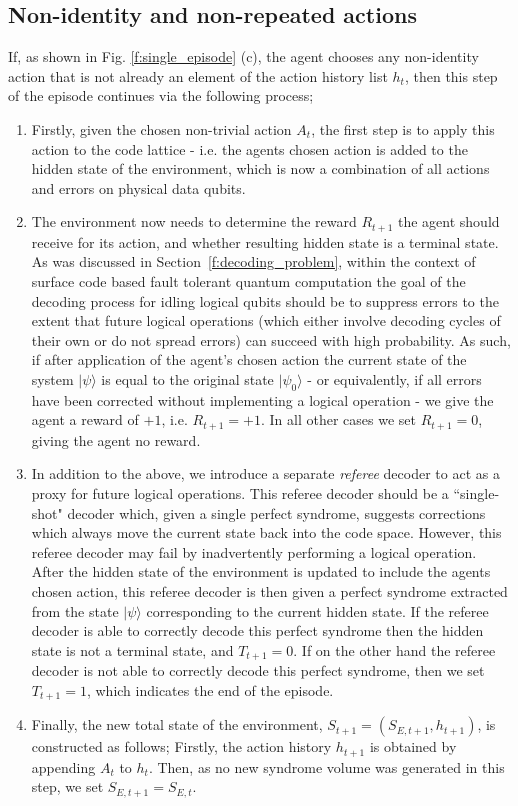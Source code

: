 \documentclass[twocolumn,preprintnumbers,amsmath,amssymb,notitlepage,nofootinbib,longbibliography,superscriptaddress,aps,pra,10pt]{revtex4-1}
\begin{document}
	\subsection{Non-identity and non-repeated actions}

		If, as shown in Fig. \ref{f:single_episode} (c), the agent chooses any non-identity action that is not already an element of the action history list $h_t$, then this step of the episode continues via the following process;

		\begin{enumerate}
			\item Firstly, given the chosen non-trivial action $A_t$, the first step is to apply this action to the code lattice - i.e. the agents chosen action is added to the hidden state of the environment, which is now a combination of all actions and errors on physical data qubits.
			\item The environment now needs to determine the reward $R_{t+1}$ the agent should receive for its action, and whether resulting hidden state is a terminal state.
			As was discussed in Section~\ref{f:decoding_problem}, within the context of surface code based fault tolerant quantum computation the goal of the decoding process for idling logical qubits should be to suppress errors to the extent that future logical operations (which either involve decoding cycles of their own or do not spread errors) can succeed with high probability.
			As such, if after application of the agent's chosen action the current state of the system $|\psi\rangle$ is equal to the original state $|\psi_0\rangle$ - or equivalently, if all errors have been corrected without implementing a logical operation - we give the agent a reward of $+1$, i.e. $R_{t+1} = +1$.
			In all other cases we set $R_{t+1} = 0$, giving the agent no reward.
			\item In addition to the above, we introduce a separate \emph{referee} decoder to act as a proxy for future logical operations.
			This referee decoder should be a ``single-shot" decoder which, given a single perfect syndrome, suggests corrections which always move the current state back into the code space.
			However, this referee decoder may fail by inadvertently performing a logical operation.
			After the hidden state of the environment is updated to include the agents chosen action, this referee decoder is then given a perfect syndrome extracted from the state $|\psi\rangle$ corresponding to the current hidden state.
			If the referee decoder is able to correctly decode this perfect syndrome then the hidden state is not a terminal state, and $T_{t+1} = 0$.
			If on the other hand the referee decoder is not able to correctly decode this perfect syndrome, then we set $T_{t+1}=1$, which indicates the end of the episode.
			\item Finally, the new total state of the environment,  $S_{t+1} = (S_{E,t+1},h_{t+1})$, is constructed as follows;
			Firstly, the action history $h_{t+1}$ is obtained by appending $A_t$ to $h_t$.
			Then, as no new syndrome volume was generated in this step, we set $S_{E,{t+1}} = S_{E,t}$.
		\end{enumerate}
		
\end{document}
